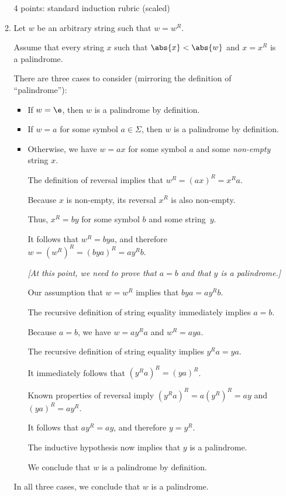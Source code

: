 \documentclass[11pt]{article}
\begin{document}
\begin{enumerate}
\begin{solution}
\begin{enumerate}
\begin{rubric}
4 points: standard induction rubric (scaled)
\end{rubric}

\medskip
\item
Let $w$ be an arbitrary string such that $w = w^R$.

Assume that every string $x$ such that $\abs{x} < \abs{w}$ and $x = x^R$ is a palindrome.

There are three cases to consider (mirroring the definition of “palindrome”):
\begin{itemize}
\item 
If $w = \e$, then $w$ is a palindrome by definition.
\item 
If $w = a$ for some symbol $a\in\Sigma$, then $w$ is a palindrome by definition.
\item
Otherwise, we have $w = ax$ for some symbol $a$ and some \emph{non-empty} string $x$.
  
The definition of reversal implies that $w^R = (ax)^R = x^R a$.

Because $x$ is non-empty, its reversal $x^R$ is also non-empty.

Thus, $x^R = by$ for some symbol $b$ and some string~$y$.

It follows that $w^R = bya$, and therefore $w = (w^R)^R = (bya)^R = a y^R b$.


\medskip
\emph{[At this point, we need to prove that $a=b$ and that $y$ is a palindrome.]}
\medskip

Our assumption that $w = w^R$ implies that $bya = a y^R b$.

The recursive definition of string equality immediately implies $a=b$.

\medskip
Because $a=b$, we have $w = ay^Ra$ and $w^R = a y a$.

The recursive definition of string equality implies $y^Ra = ya$.

It immediately follows that $(y^R a)^R = (ya)^R$.

Known properties of reversal imply $(y^R a)^R = a (y^R)^R = ay$ and $(ya)^R = a y^R$.

It follows that $ay^R = ay$, and therefore $y = y^R$.

The inductive hypothesis now implies that $y$ is a palindrome.

\medskip
We conclude that $w$ is a palindrome by definition.
\end{itemize}
In all three cases, we conclude that $w$ is a palindrome.
\end{enumerate}


\end{solution}
\end{enumerate}
\end{document}
